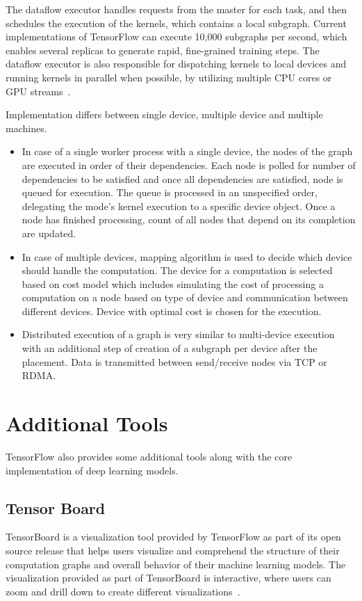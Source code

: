 The dataflow executor handles requests from the master for each task,
and then schedules the execution of the kernels, which contains a
local subgraph. Current implementations of TensorFlow can execute
10,000 subgraphs per second, which enables several replicas to
generate rapid, fine-grained training steps. The dataflow executor is
also responsible for dispatching kernels to local devices and running
kernels in parallel when possible, by utilizing multiple CPU cores or
GPU streams~\cite{hid-sp18-510-tensorflow-whitepaper-2}. 

Implementation differs between single device, multiple device 
and multiple machines.

\begin{itemize}
	\item In case of a single worker process with a single device, the nodes of
the graph are executed in order of their dependencies. Each node is
polled for number of dependencies to be satisfied and once all
dependencies are satisfied, node is queued for execution. The queue is
processed in an unspecified order, delegating the mode's kernel
execution to a specific device object. Once a node has finished
processing, count of all nodes that depend on its completion are
updated. 
	\item In case of multiple devices, mapping algorithm is used to
decide which device should handle the computation. The device for
a computation is selected based on cost model which includes
simulating the cost of processing a computation on a node based on
type of device and communication between different devices. Device
with optimal cost is chosen for the execution. 
	\item Distributed execution of a graph is very similar to multi-device
execution with an additional step of creation of a subgraph per device
after the placement. Data is transmitted between send/receive nodes via TCP or
RDMA.
\end{itemize}

\section{Additional Tools}
TensorFlow also provides some additional tools along with the core implementation of
deep learning models.

\subsection{Tensor Board}
TensorBoard is a visualization tool provided by TensorFlow as part of
its open source release that helps users visualize and comprehend the
structure of their computation graphs and overall behavior of their
machine learning models. The visualization provided as part of
TensorBoard is interactive, where users can zoom and drill down to
create different
visualizations~\cite{hid-sp18-510-tensorflow2015-whitepaper}. 

